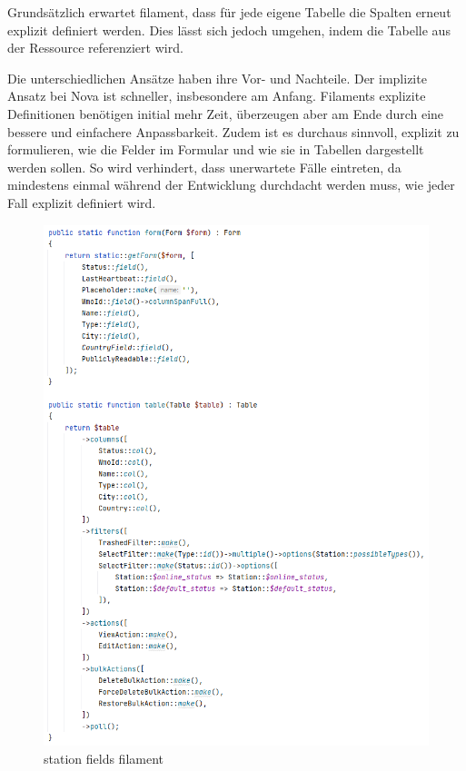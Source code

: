 Grundsätzlich erwartet filament, dass für jede eigene Tabelle die Spalten erneut explizit definiert werden.
Dies lässt sich jedoch umgehen, indem die Tabelle aus der Ressource referenziert wird.

Die unterschiedlichen Ansätze haben ihre Vor- und Nachteile.
Der implizite Ansatz bei Nova ist schneller, insbesondere am Anfang.
Filaments explizite Definitionen benötigen initial mehr Zeit, überzeugen aber am Ende durch eine bessere und einfachere Anpassbarkeit.
Zudem ist es durchaus sinnvoll, explizit zu formulieren, wie die Felder im Formular und wie sie in Tabellen dargestellt werden sollen.
So wird verhindert, dass unerwartete Fälle eintreten, da mindestens einmal während der Entwicklung durchdacht werden muss, wie jeder Fall explizit definiert wird.

\begin{figure}[h!]
    \centering
    \caption{station fields filament}
    \label{fig:station_fields_filament}
    \includegraphics[scale=0.50]{assets/station_fields_filament}
\end{figure}

